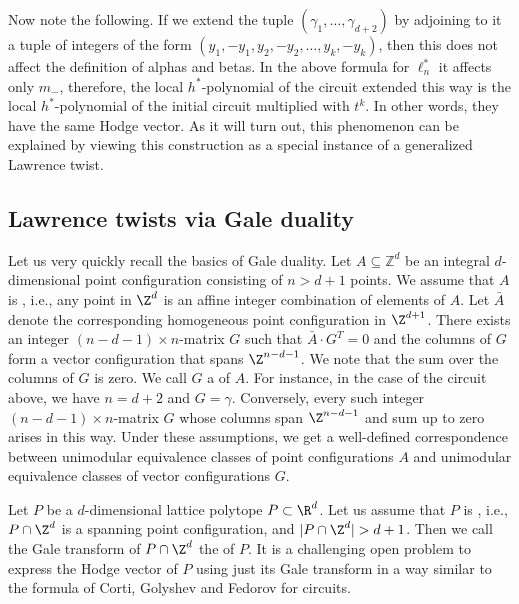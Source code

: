 \documentclass[reqno, 11pt, a4paper, oneside]{amsart}
\begin{document}
Now note the following. If we extend the tuple $(\gamma_1, \ldots, \gamma_{d+2})$ by adjoining to it a tuple of integers of the form $(y_1,-y_1, y_2,-y_2, \ldots, y_k, -y_k)$, then this does not affect the definition of alphas and betas.  In the above formula for $\ell^*_n$ it affects only $m_-$, therefore, the local $h^*$-polynomial of the  circuit extended this way is the local $h^*$-polynomial of the initial circuit multiplied with $t^k$. In other words, they have the same Hodge vector. As it will turn out, this phenomenon can be explained by viewing this construction as a special instance of a generalized Lawrence twist. 

\subsection{Lawrence twists via Gale duality}

Let us very quickly recall the basics of Gale duality. Let $A \subseteq \mathbb{Z}^d$ be an integral $d$-dimensional point configuration consisting of $n>d+1$ points. We assume that $A$ is , i.e., any point in $\Z^d$ is an affine integer combination of elements of $A$. Let $\bar{A}$ denote the corresponding homogeneous point configuration in $\Z^{d+1}$. There exists an integer $(n-d-1) \times n$-matrix $G$ such that $\bar{A} \cdot G^T=0$ and the columns of $G$ form a vector configuration that spans $\Z^{n-d-1}$. We note that the sum over the columns of $G$ is zero. We call $G$ a  of $A$. For instance, in the case of the circuit above, we have $n=d+2$ and $G=\gamma$.
Conversely, every such integer $(n-d-1) \times n$-matrix $G$ whose columns span $\Z^{n-d-1}$ and sum up to zero arises in this way. 
Under these assumptions, we get a well-defined correspondence between unimodular equivalence classes of point configurations $A$ and unimodular equivalence classes of vector configurations $G$.

\smallskip

\begin{ex}
    Let $P$ be a $d$-dimensional lattice polytope $P \subset \R^d$. Let us assume that $P$ is , i.e., $P \cap \Z^d$ is a spanning point configuration, and $|P \cap \Z^d| > d+1$. Then we call the Gale transform of $P \cap \Z^d$ the  of $P$. It is a challenging open problem to express the Hodge vector of $P$ using just its Gale transform in a way similar to the formula of Corti, Golyshev and Fedorov for circuits. 
\end{ex}
\end{document}

